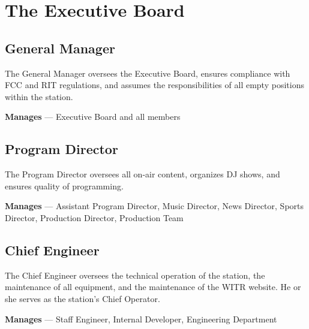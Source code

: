 \documentclass{witrman}
\begin{document}
\section{The Executive Board}
\subsection{General Manager}
The General Manager oversees the Executive Board, ensures compliance with FCC
and RIT regulations, and assumes the responsibilities of all empty positions
within the station.


\textbf{Manages} --- Executive Board and all members

\subsection{Program Director}
The Program Director oversees all on-air content, organizes DJ shows, and
ensures quality of programming.

\textbf{Manages} --- Assistant Program Director, Music Director, News Director,
Sports Director, Production Director, Production Team

\subsection{Chief Engineer}
The Chief Engineer oversees the technical operation of the station, the
maintenance of all equipment, and the maintenance of the WITR website. He or she
serves as the station’s Chief Operator.

\textbf{Manages} --- Staff Engineer, Internal Developer, Engineering Department
\end{document}
